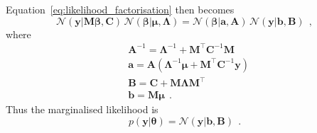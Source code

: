 \documentclass[12pt,dvipsnames]{report}
\renewcommand{\vec}[1]{\boldsymbol{\mathbf{#1}}}
\newcommand{\hquad}{~~}
\begin{document}
Equation~\ref{eq:likelihood_factorisation} then becomes
\citep[for the proof see][]{arXiv:2005.14199}
\begin{equation}
    \mathcal{N}(\vec{y} \lvert \vec{M} \vec\beta, \vec{C})\, \mathcal{N}(\vec\beta \lvert\vec{\mu}, \vec{\Lambda})=\mathcal{N}(\vec\beta \lvert\vec{a}, \vec{A})\, \mathcal{N}(\vec{y} \lvert\vec{b}, \vec{B})
    \hquad,
\end{equation}
where
\begin{align}
     & \vec{A}^{-1}   =\vec{\Lambda}^{-1}+\vec{M}^{\intercal} \vec{C}^{-1} \vec{M}                                                     \\
     & \vec{a}     =\vec{A} \left(\boldsymbol{\Lambda}^{-1} \boldsymbol{\mu}+\vec{M}^{\intercal} \mathbf{C}^{-1} \boldsymbol{y}\right) \\
     & \mathbf{B}=\mathbf{C}+\vec{M} \vec{\Lambda} \vec{M}^{\intercal}                                                                 \\
     & \vec{b}=\vec{M} \vec{\mu}
     \hquad.
\end{align}
Thus the marginalised likelihood is
\begin{equation}
    p(\vec{y}\lvert \vec{\theta}) = \mathcal{N}(\vec{y} \lvert \vec{b}, \vec{B})
    \hquad.
    \label{eq:likelihood_lin_params_marginalised}
\end{equation}
\end{document}
